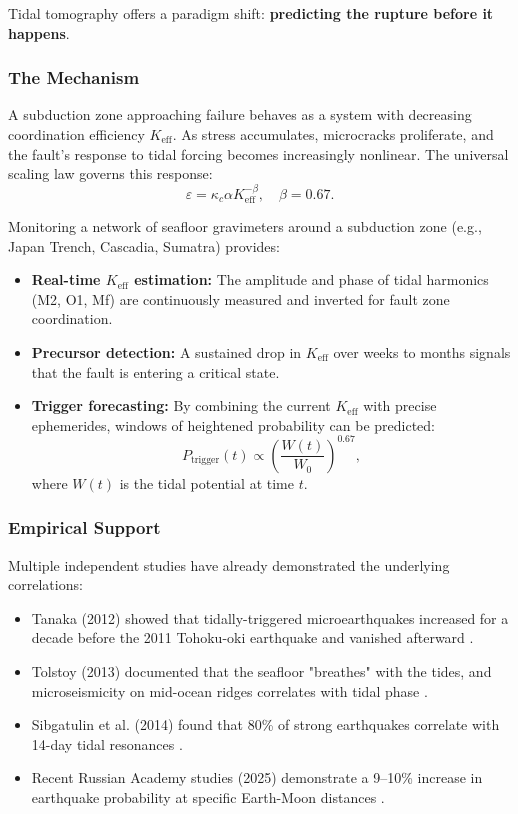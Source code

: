 \documentclass[12pt,a4paper]{article}
\theoremstyle{remark}
\begin{document}
	Tidal tomography offers a paradigm shift: \textbf{predicting the rupture before it happens}.
	
	\subsubsection{The Mechanism}
	
	A subduction zone approaching failure behaves as a system with decreasing coordination efficiency \(K_{\mathrm{eff}}\). As stress accumulates, microcracks proliferate, and the fault's response to tidal forcing becomes increasingly nonlinear. The universal scaling law governs this response:
	\[
	\varepsilon = \kappa_c \alpha K_{\mathrm{eff}}^{-\beta}, \quad \beta = 0.67.
	\]
	
	Monitoring a network of seafloor gravimeters around a subduction zone (e.g., Japan Trench, Cascadia, Sumatra) provides:
	\begin{itemize}
		\item \textbf{Real-time \(K_{\mathrm{eff}}\) estimation:} The amplitude and phase of tidal harmonics (M2, O1, Mf) are continuously measured and inverted for fault zone coordination.
		\item \textbf{Precursor detection:} A sustained drop in \(K_{\mathrm{eff}}\) over weeks to months signals that the fault is entering a critical state.
		\item \textbf{Trigger forecasting:} By combining the current \(K_{\mathrm{eff}}\) with precise ephemerides, windows of heightened probability can be predicted:
		\[
		P_{\text{trigger}}(t) \propto \left( \frac{W(t)}{W_0} \right)^{0.67},
		\]
		where \(W(t)\) is the tidal potential at time \(t\).
	\end{itemize}
	
	\subsubsection{Empirical Support}
	
	Multiple independent studies have already demonstrated the underlying correlations:
	\begin{itemize}
		\item Tanaka (2012) showed that tidally-triggered microearthquakes increased for a decade before the 2011 Tohoku-oki earthquake and vanished afterward \cite{Tanaka2012}.
		\item Tolstoy (2013) documented that the seafloor "breathes" with the tides, and microseismicity on mid-ocean ridges correlates with tidal phase \cite{Tolstoy2013}.
		\item Sibgatulin et al. (2014) found that 80\% of strong earthquakes correlate with 14-day tidal resonances \cite{Sibgatulin2014}.
		\item Recent Russian Academy studies (2025) demonstrate a 9–10\% increase in earthquake probability at specific Earth-Moon distances \cite{RAN2025}.
	\end{itemize}
	
\end{document}
